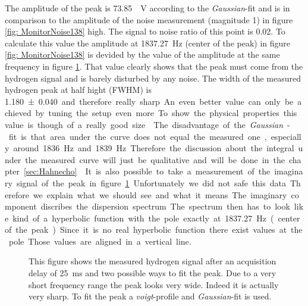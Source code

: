 The amplitude of the peak is \SI{73.85}{\mu \volt} according to the \textit{Gaussian}-fit and is in comparison to the amplitude of the noise measurement (magnitude \SI{1}{}) in figure \ref{fig: MonitorNoise138} high. The signal to noise ratio of this point is \SI{0.02}{}. To calculate this value the amplitude at \SI{1837.27}{\hertz} (center of the peak) in figure \ref{fig: MonitorNoise138} is devided by the value of the amplitude at the same frequency in figure \ref{fig:Pulsandcollect138_delay_25_gauss}. That value clearly shows that the peak must come from the hydrogen signal and is barely disturbed by any noise.\newline
The width of the measured hydrogen peak at half hight (FWHM) is \SI{1.180 \pm 0.040} and therefore really sharp. An even better value can only be achieved by tuning the setup even more. To show the physical properties this value is though of a really good size.\newline
The disadvantage of the \textit{Gaussian}-fit is that area under the curve does not equal the measured one, especially around \SI{1836}{\hertz} and \SI{1839}{\hertz}. Therefore the discussion about the integral under the measured curve will just be qualitative and will be done in the chapter \ref{sec:Hahnecho}.\newline
It is also possible to take a measurement of the imaginary signal of the peak in figure \ref{fig:Pulsandcollect138_delay_25_gauss}. Unfortunately we did not safe this data. Therefore we explain what we should see and what it means. The imaginary component discribes the dispersion spectrum. The spectrum then has to look like kind of a hyperbolic function with the pole exactly at \SI{1837.27}{\hertz} (center of the peak). Since it is no real hyperbolic function there exist values at the pole. Those values are aligned in a vertical line.
\begin{figure}[H]
    \centering
    
    \caption[This figure shows the measured hydrogen signal after an acquisition delay of \SI{25}{\milli \second} and two possible ways to fit the peak.]{This figure shows the measured hydrogen signal after an acquisition delay of \SI{25}{\milli \second} and two possible ways to fit the peak. Due to a very short frequency range the peak looks very wide. Indeed it is actually very sharp. To fit the peak a \textit{voigt}-profile and \textit{Gaussian}-fit is used.}
    \label{fig:Pulsandcollect138_delay_25_gauss}
\end{figure}